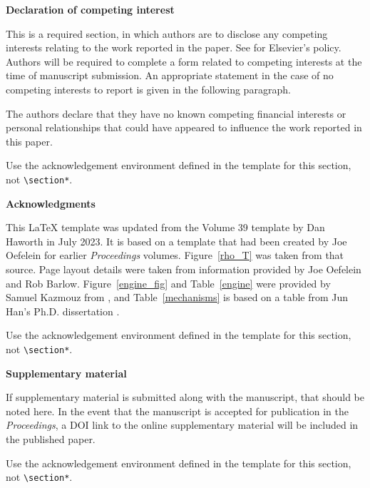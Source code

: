 \documentclass[twocolumn,10pt,dvipsnames]{article} %
\renewcommand{\section}%
              [1]%
              {%
               \bgroup%
               \flushleft%
               \small\bf%
               \refstepcounter{section}%
               \arabic{section}. #1%
               \par%
               \egroup%
              }%
\newcommand{\acknowledgement}%
              [1]%
              {%
               \bgroup%
               \flushleft%
               \small\bf%
               #1%
               \par%
               \egroup%
              }%
\begin{document}
\fi
\iffalse

\acknowledgement{Declaration of competing interest} \addvspace{10pt}

This is a required section, in which authors are to disclose any competing interests relating to the work reported in the paper. See \cite{elsevier_ci} for Elsevier's policy. Authors will be required to complete a form related to competing interests at the time of manuscript submission. An appropriate statement in the case of no competing interests to report is given in the following paragraph.

The authors declare that they have no known competing financial interests or personal relationships that could have appeared to influence the work reported in this paper.

Use the acknowledgement environment defined in the template for this section, not \verb+\section*+. 

\acknowledgement{Acknowledgments} \addvspace{10pt}

This LaTeX template was updated from the Volume 39 template by Dan Haworth in July 2023. It is based on a template that had been created by Joe Oefelein for earlier {\em Proceedings} volumes. Figure~\ref{rho_T} was taken from that source. Page layout details were taken from information provided by Joe Oefelein and Rob Barlow. Figure~\ref{engine_fig} and Table~\ref{engine} were provided by Samuel Kazmouz from \cite{kazmouz21}, and Table~\ref{mechanisms} is based on a table from Jun Han's Ph.D. dissertation \cite{han22}.

Use the acknowledgement environment defined in the template for this section, not \verb+\section*+. 

\acknowledgement{Supplementary material} \addvspace{10pt}

If supplementary material is submitted along with the manuscript, that should be noted here. In the event that the manuscript is accepted for publication in the {\em Proceedings}, a DOI link to the online supplementary material will be included in the published paper.

Use the acknowledgement environment defined in the template for this section, not \verb+\section*+. 
\end{document}
